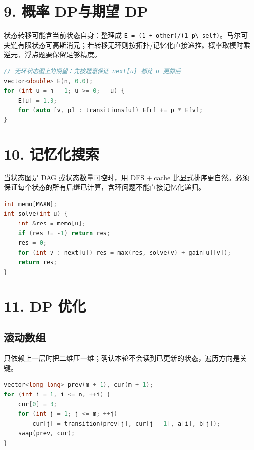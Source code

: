 \section{9. 概率 DP与期望 DP}\label{ux6982ux7387-dpux4e0eux671fux671b-dp}

状态转移可能含当前状态自身：整理成 \passthrough{\lstinline!E = (1 + other)/(1-p\_self)!}。马尔可夫链有限状态可高斯消元；若转移无环则按拓扑/记忆化直接递推。概率取模时乘逆元，浮点题要保留足够精度。

\begin{lstlisting}[language={C++}]
// 无环状态图上的期望：先按题意保证 next[u] 都比 u 更靠后
vector<double> E(n, 0.0);
for (int u = n - 1; u >= 0; --u) {
    E[u] = 1.0;
    for (auto [v, p] : transitions[u]) E[u] += p * E[v];
}
\end{lstlisting}

\section{10. 记忆化搜索}\label{ux8bb0ux5fc6ux5316ux641cux7d22}

当状态图是 DAG 或状态数量可控时，用 DFS + cache 比显式排序更自然。必须保证每个状态的所有后继已计算，含环问题不能直接记忆化递归。

\begin{lstlisting}[language={C++}]
int memo[MAXN];
int solve(int u) {
    int &res = memo[u];
    if (res != -1) return res;
    res = 0;
    for (int v : next[u]) res = max(res, solve(v) + gain[u][v]);
    return res;
}
\end{lstlisting}

\section{11. DP 优化}\label{dp-ux4f18ux5316}

\subsection{滚动数组}\label{ux6edaux52a8ux6570ux7ec4}

只依赖上一层时把二维压一维；确认本轮不会读到已更新的状态，遍历方向是关键。

\begin{lstlisting}[language={C++}]
vector<long long> prev(m + 1), cur(m + 1);
for (int i = 1; i <= n; ++i) {
    cur[0] = 0;
    for (int j = 1; j <= m; ++j)
        cur[j] = transition(prev[j], cur[j - 1], a[i], b[j]);
    swap(prev, cur);
}
\end{lstlisting}

